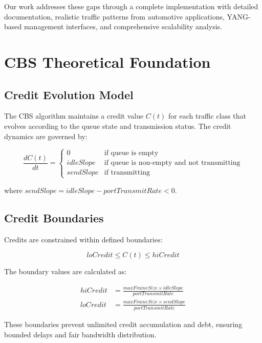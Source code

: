 \documentclass[10pt, journal, compsoc]{IEEEtran}
\begin{document}
Our work addresses these gaps through a complete implementation with detailed documentation, realistic traffic patterns from automotive applications, YANG-based management interfaces, and comprehensive scalability analysis.

\section{CBS Theoretical Foundation}
\label{sec:cbs_theory}

\subsection{Credit Evolution Model}

The CBS algorithm maintains a credit value $C(t)$ for each traffic class that evolves according to the queue state and transmission status. The credit dynamics are governed by:

\begin{equation}
\frac{dC(t)}{dt} = \begin{cases}
0 & \text{if queue is empty} \\
idleSlope & \text{if queue is non-empty and not transmitting} \\
sendSlope & \text{if transmitting}
\end{cases}
\end{equation}

where $sendSlope = idleSlope - portTransmitRate < 0$.

\subsection{Credit Boundaries}

Credits are constrained within defined boundaries:

\begin{equation}
loCredit \leq C(t) \leq hiCredit
\end{equation}

The boundary values are calculated as:

\begin{align}
hiCredit &= \frac{maxFrameSize \times idleSlope}{portTransmitRate} \\
loCredit &= \frac{maxFrameSize \times sendSlope}{portTransmitRate}
\end{align}

These boundaries prevent unlimited credit accumulation and debt, ensuring bounded delays and fair bandwidth distribution.
\end{document}
